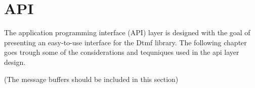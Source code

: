 \chapter{API}\label{chap:api}
The application programming interface (API) layer is designed with the goal of presenting an easy-to-use interface for the Dtmf library. The following chapter goes trough some of the considerations and tequniques used in the api layer design.

(The message buffers should be included in this section)


















